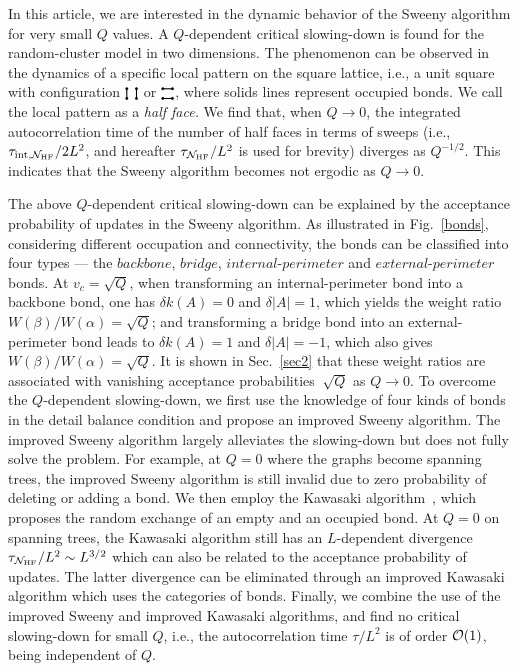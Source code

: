 \documentclass[aps,pre,twocolumn,superscriptaddress,longbibliography,floatfix]{revtex4-2}
\newcommand{\PPa}{
\begin{tikzpicture}[baseline=1pt]
 \draw [fill] (0,0) circle(0.20ex);
 \draw [fill] (0.25,0) circle(0.20ex);
 \draw [fill] (0,0.25) circle(0.20ex);
 \draw [fill] (0.25,0.25) circle(0.20ex);
 \draw [thick] (0,0)--(0,0.25);
 \draw [thick] (0.25,0)--(0.25,0.25);
\end{tikzpicture}
}
\newcommand{\PPb}{
\begin{tikzpicture}[baseline=1pt]
 \draw [fill] (0,0) circle(0.20ex);
 \draw [fill] (0.25,0) circle(0.20ex);
 \draw [fill] (0,0.25) circle(0.20ex);
 \draw [fill] (0.25,0.25) circle(0.20ex);
 \draw [thick] (0,0)--(0.25,0);
 \draw [thick] (0,0.25)--(0.25,0.25);
\end{tikzpicture}
}
\begin{document}
In this article, we are interested in the dynamic behavior of the Sweeny algorithm for very small $Q$ values.
A $Q$-dependent critical slowing-down is found
for the random-cluster model in two dimensions. The phenomenon can be observed in the dynamics of
a specific local pattern on the square lattice, i.e., a unit square with configuration $\PPa$ or $\PPb$, where solids lines represent occupied bonds. We call the local pattern as a {\it half face.} 
We find that, when $Q\rightarrow 0$, the integrated autocorrelation time of the number of half faces in terms of sweeps (i.e., {$\tau_{{\rm int},\mathcal{N}_{\rm HF}}/2L^2$}, and hereafter $\tau_{\mathcal{N}_{\rm HF}}/L^2$ is used for brevity) diverges  as $Q^{-1/2}$.
This indicates that the Sweeny algorithm becomes not ergodic as $Q \to 0$. 

The above $Q$-dependent critical slowing-down can be explained by the acceptance probability of updates in the Sweeny algorithm. 
{As illustrated in Fig.~\ref{bonds}, considering different occupation and connectivity, the bonds can be classified into 
four types --- the $backbone$, $bridge$, $internal$-$perimeter$ and $external$-$perimeter$ bonds. 
At $v_c=\sqrt{Q}$, when transforming an internal-perimeter bond into a backbone bond, one has $\delta k(A) = 0$ and $\delta |A| = 1$, 
which yields the weight ratio $W(\beta) / W(\alpha)=\sqrt{Q}$; and transforming a bridge bond into an external-perimeter bond
leads to $\delta k(A) = 1$ and $\delta |A| = -1$, which also gives $W(\beta) / W(\alpha) = \sqrt{Q}$. It is shown in Sec.~\ref{sec2}
that these weight ratios are associated with vanishing acceptance probabilities $~\sqrt{Q}$ as $Q \rightarrow 0$.}
To overcome {the $Q$-dependent slowing-down},
we first use the knowledge of four kinds of bonds in the detail balance condition and propose an improved Sweeny algorithm. 
The improved Sweeny algorithm largely alleviates the slowing-down but does not fully solve the problem.
For example, at $Q=0$ where the graphs become spanning trees, the improved Sweeny algorithm is still invalid
due to zero probability of deleting or adding a bond. 
We then employ the Kawasaki algorithm~\cite{kawasaki1966diffusion}, which proposes the random exchange of an empty and an occupied bond. 
At $Q=0$ on spanning trees, the Kawasaki algorithm still has an $L$-dependent divergence
$\tau_{\mathcal{N}_{\rm HF}}/L^2 \sim L^{3/2}$ which can also be related to the acceptance probability of updates.
The latter divergence can be eliminated through an improved Kawasaki algorithm which uses the categories of bonds. 
Finally, we combine the use of the improved Sweeny and improved Kawasaki algorithms, and find no critical slowing-down for small $Q$, i.e., 
the autocorrelation time $\tau/L^2$ is of order ${\cal O}(1)$, being independent of $Q$.
\end{document}
